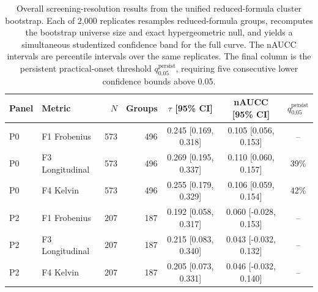 \documentclass[11pt]{article}
\renewcommand{\thetable}{S\arabic{table}}
\begin{document}
\begin{table}[htbp]
\small
\setlength{\tabcolsep}{4pt}
\centering
\renewcommand{\thetable}{S\arabic{table}a}
\renewcommand{\theHtable}{\arabic{table}a}
\caption{Overall screening-resolution results from the unified reduced-formula cluster bootstrap. Each of 2,000 replicates resamples reduced-formula groups, recomputes the bootstrap universe size and exact hypergeometric null, and yields a simultaneous studentized confidence band for the full curve. The nAUCC intervals are percentile intervals over the same replicates. The final column is the persistent practical-onset threshold $q^{\mathrm{persist}}_{0.05}$, requiring five consecutive lower confidence bounds above 0.05.}
\label{tab:si_upgrade_overall}
\begin{tabular}{llrrccc}
\toprule
Panel & Metric & $N$ & Groups & $\tau$ [95\% CI] & nAUCC [95\% CI] & $q^{\mathrm{persist}}_{0.05}$ \\
\midrule
P0 & F1 Frobenius & 573 & 496 & 0.245 [0.169, 0.318] & 0.105 [0.056, 0.153] & -- \\
P0 & F3 Longitudinal & 573 & 496 & 0.269 [0.195, 0.337] & 0.110 [0.060, 0.157] & 39\% \\
P0 & F4 Kelvin & 573 & 496 & 0.255 [0.179, 0.329] & 0.106 [0.059, 0.154] & 42\% \\
P2 & F1 Frobenius & 207 & 187 & 0.192 [0.058, 0.317] & 0.060 [-0.028, 0.153] & -- \\
P2 & F3 Longitudinal & 207 & 187 & 0.215 [0.083, 0.340] & 0.043 [-0.032, 0.132] & -- \\
P2 & F4 Kelvin & 207 & 187 & 0.205 [0.073, 0.331] & 0.046 [-0.032, 0.140] & -- \\
\bottomrule
\end{tabular}
\end{table}
\addtocounter{table}{-1}
\renewcommand{\thetable}{S\arabic{table}b}
\renewcommand{\theHtable}{\arabic{table}b}
\end{document}
